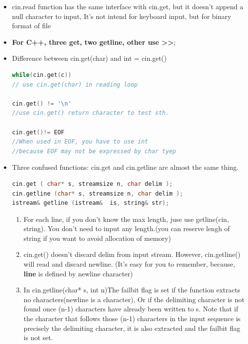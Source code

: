 \documentclass[a4paper,12pt,twoside]{book}
\begin{document}
\begin{itemize}
\begin{lstlisting}[frame=single, language=c++]
//line	
gets(char_array)  //c
fgets(char_array, n , FILE *) //recommend to use this for safety.

cin.getline(char * ,int n) //c++ read and discard newline
cin.get(char * ,int n) //not read newline
std::getline(istream&  is, string& str)
\end{lstlisting}
	
	\item cin.read function has the same interface with cin.get, but it doesn't append a null character to input, It's not intend for keyboard input, but for binary format of file
	
	\item \textbf{For C++, three get, two getline, other use >>};
	
	\item Difference between cin.get(char) and int = cin.get()
\begin{lstlisting}[frame=single, language=c++]
while(cin.get(c))
// use cin.get(char) in reading loop

cin.get() != '\n'
//use cin.get() return character to test sth.
	
cin.get()!= EOF
//When used in EOF, you have to use int
//because EOF may not be expressed by char tyep
\end{lstlisting}
	
	\item Three confused functions: cin.get and cin.getline are almost the same thing.
\begin{lstlisting}[frame=single, language=c++]
cin.get ( char* s, streamsize n, char delim );
cin.getline (char* s, streamsize n, char delim );
istream& getline (istream&  is, string& str);
\end{lstlisting}
	
	\begin{enumerate}
		
		\item For each line, if you don't know the max length, juse use getline(cin, string). You don't need to input any length.(you can reserve lengh of string if you want to avoid allocation of memory)
		
		\item cin.get() doesn't discard delim from input stream. However, cin.getline() will read and discard newline.  (It's easy for you to remember, because, \textbf{line} is defined by newline character)
		
		\item In cin.getline(char* s, int n)The failbit flag is set if the function extracts no characters(newline is a character), Or if the delimiting character is not found once (n-1) characters have already been written to s. Note that if the character that follows those (n-1) characters in the input sequence is precisely the delimiting character, it is also extracted and the failbit flag is not set.
		

\end{enumerate}
\end{itemize}
\end{document}
